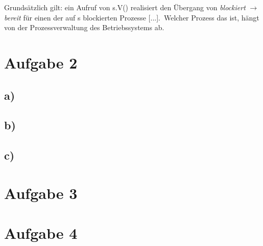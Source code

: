 \documentclass[11pt,a4paper,DIV=10,]{scrartcl}
\begin{document}
Grundsätzlich gilt: \glqq[...] ein Aufruf von s.V() realisiert den Übergang von \textit{blockiert} $\rightarrow$ \textit{bereit} für einen der auf s blockierten Prozesse [...]\cite[vgl.][S. 55]{Maurer.2012}.\grqq\ Welcher Prozess das ist, hängt von der Prozessverwaltung des Betriebssystems ab.

\section*{Aufgabe 2}
\subsection*{a)}
\subsection*{b)}
\subsection*{c)}
\section*{Aufgabe 3}
\section*{Aufgabe 4}




\end{document}
